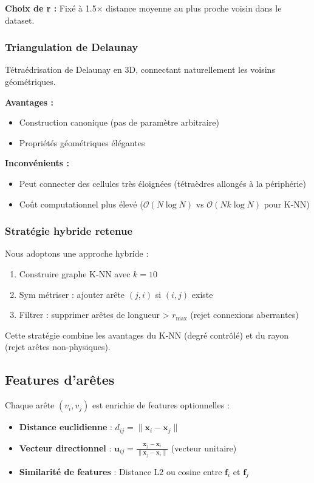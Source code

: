 \textbf{Choix de r :}
Fixé à 1.5× distance moyenne au plus proche voisin dans le dataset.

\subsubsection{Triangulation de Delaunay}

Tétraédrisation de Delaunay en 3D, connectant naturellement les voisins géométriques.

\textbf{Avantages :}
\begin{itemize}
    \item Construction canonique (pas de paramètre arbitraire)
    \item Propriétés géométriques élégantes
\end{itemize}

\textbf{Inconvénients :}
\begin{itemize}
    \item Peut connecter des cellules très éloignées (tétraèdres allongés à la périphérie)
    \item Coût computationnel plus élevé ($\mathcal{O}(N \log N)$ vs $\mathcal{O}(N k \log N)$ pour K-NN)
\end{itemize}

\subsubsection{Stratégie hybride retenue}

Nous adoptons une approche hybride :
\begin{enumerate}
    \item Construire graphe K-NN avec $k = 10$
    \item Sym métriser : ajouter arête $(j,i)$ si $(i,j)$ existe
    \item Filtrer : supprimer arêtes de longueur > $r_{\max}$ (rejet connexions aberrantes)
\end{enumerate}

Cette stratégie combine les avantages du K-NN (degré contrôlé) et du rayon (rejet arêtes non-physiques).

\subsection{Features d'arêtes}

Chaque arête $(v_i, v_j)$ est enrichie de features optionnelles :

\begin{itemize}
    \item \textbf{Distance euclidienne} : $d_{ij} = \|\mathbf{x}_i - \mathbf{x}_j\|$
    \item \textbf{Vecteur directionnel} : $\mathbf{u}_{ij} = \frac{\mathbf{x}_j - \mathbf{x}_i}{\|\mathbf{x}_j - \mathbf{x}_i\|}$ (vecteur unitaire)
    \item \textbf{Similarité de features} : Distance L2 ou cosine entre $\mathbf{f}_i$ et $\mathbf{f}_j$
\end{itemize}

